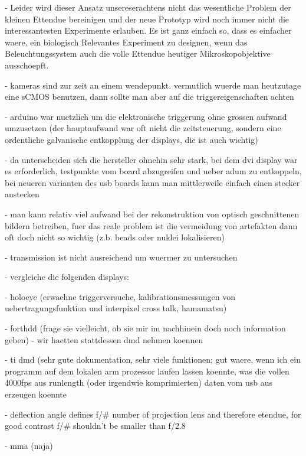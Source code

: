 \documentclass[oneside,a4paper,12pt,BCOR20mm,DIV14]{scrbook} %
\begin{document}
  - Leider wird dieser Ansatz unsereserachtens nicht das wesentliche
    Problem der kleinen Ettendue bereinigen und der neue Prototyp wird
    noch immer nicht die interessantesten Experimente erlauben. Es ist
    ganz einfach so, dass es einfacher waere, ein biologisch
    Relevantes Experiment zu designen, wenn das Beleuchtungssystem
    auch die volle Ettendue heutiger Mikroskopobjektive ausschoepft.

- kameras sind zur zeit an einem wendepunkt. vermutlich wuerde man
  heutzutage eine sCMOS benutzen, dann sollte man aber auf die
  triggereigenschaften achten

- arduino war nuetzlich um die elektronische triggerung ohne grossen
  aufwand umzusetzen (der hauptaufwand war oft nicht die
  zeitsteuerung, sondern eine ordentliche galvanische entkopplung der
  displays, die ist auch wichtig)

  - da unterscheiden sich die hersteller ohnehin sehr stark, bei dem
    dvi display war es erforderlich, testpunkte vom board abzugreifen
    und ueber adum zu entkoppeln, bei neueren varianten des usb boards
    kann man mittlerweile einfach einen stecker anstecken

- man kann relativ viel aufwand bei der rekonstruktion von optisch
  geschnittenen bildern betreiben, fuer das reale problem ist die
  vermeidung von artefakten dann oft doch nicht so wichtig (z.b. beads
  oder nuklei lokalisieren)

- transmission ist nicht ausreichend um wuermer zu untersuchen  

- vergleiche die folgenden displays:

  - holoeye (erwaehne triggerversuche, kalibrationsmessungen von
    uebertragungsfunktion und interpixel cross talk, hamamatsu)

  - forthdd (frage sie vielleicht, ob sie mir im nachhinein doch noch
    information geben)
  - wir haetten stattdessen dmd nehmen koennen

  - ti dmd (sehr gute dokumentation, sehr viele funktionen; gut waere,
    wenn ich ein programm auf dem lokalen arm prozessor laufen lassen
    koennte, was die vollen 4000fps aus runlength (oder irgendwie
    komprimierten) daten vom usb aus erzeugen koennte

    - deflection angle defines f/\# number of projection lens and
      therefore etendue, for good contrast f/\# shouldn't be smaller
      than f/2.8

  - mma (naja)

  
\end{document}
